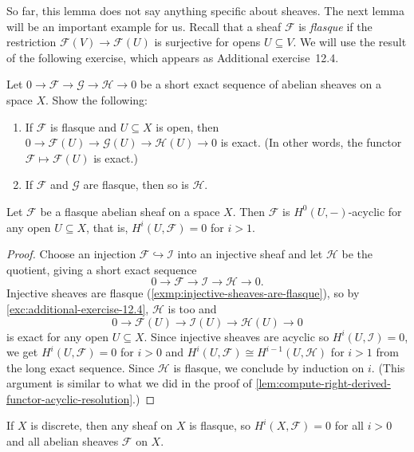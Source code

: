 So far, this lemma does not say anything specific about sheaves.
The next lemma will be an important example for us.
Recall that a sheaf \(\mathcal F\) is \emph{flasque} if the restriction \(\mathcal F(V)\to\mathcal F(U)\) is surjective for opens \(U\subseteq V\).
We will use the result of the following exercise, which appears as Additional exercise~12.4.

\begin{exc}\label{exc:additional-exercise-12.4}
Let \(0\to\mathcal F\to\mathcal G\to\mathcal H\to 0\) be a short exact sequence of abelian sheaves on a space \(X\).
Show the following:
\begin{enumerate}
\item If \(\mathcal F\) is flasque and \(U\subseteq X\) is open, then \(0\to\mathcal F(U)\to\mathcal G(U)\to\mathcal H(U)\to 0\) is exact.
  (In other words, the functor \(\mathcal F\mapsto\mathcal F(U)\) is exact.)
\item If \(\mathcal F\) and \(\mathcal G\) are flasque, then so is \(\mathcal H\).
\end{enumerate}
\end{exc}

\begin{lem}\label{lem:flasque-sheaf-evaluation-acyclic}
Let \(\mathcal F\) be a flasque abelian sheaf on a space \(X\).
Then \(\mathcal F\) is \(H^0(U,-)\)-acyclic for any open \(U\subseteq X\), that is, \(H^i(U,\mathcal F)=0\) for \(i>1\).
\end{lem}
\begin{proof}
Choose an injection \(\mathcal F\hookrightarrow\mathcal I\) into an injective sheaf and let \(\mathcal H\) be the quotient, giving a short exact sequence
\[ 0\to\mathcal F\to\mathcal I\to\mathcal H\to 0\text{.}\]
Injective sheaves are flasque (\cref{exmp:injective-sheaves-are-flasque}), so by \cref{exc:additional-exercise-12.4}, \(\mathcal H\) is too and
\[ 0\to\mathcal F(U)\to\mathcal I(U)\to\mathcal H(U)\to 0 \]
is exact for any open \(U\subseteq X\).
Since injective sheaves are acyclic so \(H^i(U,\mathcal I)=0\), we get \(H^i(U,\mathcal F)=0\) for \(i>0\) and \(H^i(U,\mathcal F)\cong H^{i-1}(U,\mathcal H)\) for \(i>1\) from the long exact sequence.
Since \(\mathcal H\) is flasque, we conclude by induction on \(i\).
(This argument is similar to what we did in the proof of \cref{lem:compute-right-derived-functor-acyclic-resolution}.)
\end{proof}

\begin{exmp}
If \(X\) is discrete, then any sheaf on \(X\) is flasque, so \(H^i(X,\mathcal F)=0\) for all \(i>0\) and all abelian sheaves \(\mathcal F\) on \(X\).
\end{exmp}

